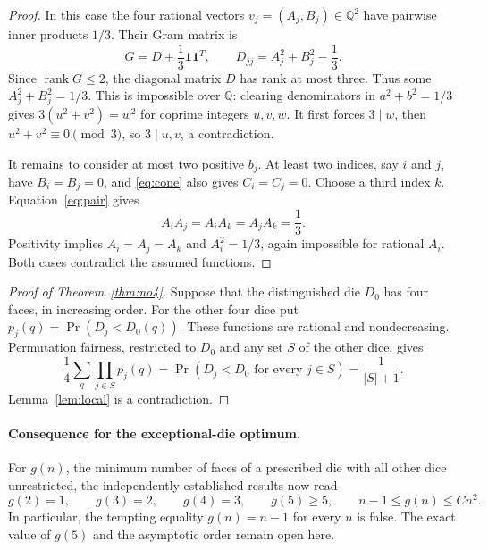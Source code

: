 \documentclass[11pt]{article}
\begin{document}
\begin{proof}
In this case the four rational vectors $v_j=(A_j,B_j)\in\mathbb Q^2$
have pairwise inner products $1/3$. Their Gram matrix is
\[
 G=D+\frac13\boldsymbol1\boldsymbol1^T,
 \qquad D_{jj}=A_j^2+B_j^2-\frac13.
\]
Since $\operatorname{rank}G\leq2$, the diagonal matrix $D$ has rank at
most three. Thus some $A_j^2+B_j^2=1/3$. This is impossible over
$\mathbb Q$: clearing denominators in $a^2+b^2=1/3$ gives
$3(u^2+v^2)=w^2$ for coprime integers $u,v,w$. It first forces $3\mid w$,
then $u^2+v^2\equiv0\pmod3$, so $3\mid u,v$, a contradiction.

It remains to consider at most two positive $b_j$. At least two indices,
say $i$ and $j$, have $B_i=B_j=0$, and \eqref{eq:cone} also gives
$C_i=C_j=0$. Choose a third index $k$. Equation~\eqref{eq:pair} gives
\[
 A_iA_j=A_iA_k=A_jA_k=\frac13.
\]
Positivity implies $A_i=A_j=A_k$ and $A_i^2=1/3$, again impossible for
rational $A_i$. Both cases contradict the assumed functions.
\end{proof}

\begin{proof}[Proof of Theorem~\ref{thm:no4}]
Suppose that the distinguished die $D_0$ has four faces, in increasing
order. For the other four dice put $p_j(q)=\Pr(D_j<D_0(q))$.
These functions are rational and nondecreasing. Permutation fairness,
restricted to $D_0$ and any set $S$ of the other dice, gives
\[
 \frac14\sum_q\prod_{j\in S}p_j(q)
  =\Pr(D_j<D_0\text{ for every }j\in S)=\frac1{|S|+1}.
\]
Lemma~\ref{lem:local} is a contradiction.
\end{proof}

\paragraph{Consequence for the exceptional-die optimum.}
For $g(n)$, the minimum number of faces of a prescribed die with all other
dice unrestricted, the independently established results now read
\[
 g(2)=1,\qquad g(3)=2,\qquad g(4)=3,\qquad g(5)\geq5,
 \qquad n-1\leq g(n)\leq Cn^2.
\]
In particular, the tempting equality $g(n)=n-1$ for every $n$ is false.
The exact value of $g(5)$ and the asymptotic order remain open here.
\end{document}
